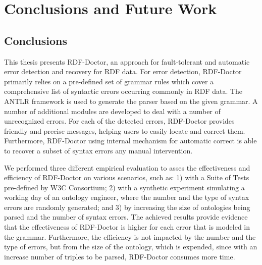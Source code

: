 \chapter{Conclusions and Future Work}
\label{ch:conclusions}

\section{Conclusions}

This thesis presents RDF-Doctor, an approach for fault-tolerant and automatic error detection and recovery for RDF data.
For error detection, RDF-Doctor primarily relies on a pre-defined set of grammar rules which cover a comprehensive list of syntactic errors occurring commonly in RDF data.
The ANTLR framework is used to generate the parser based on the given grammar.
A number of additional modules are developed to deal with a number of unrecognized errors.
For each of the detected errors, RDF-Doctor provides friendly and precise messages, helping users to easily locate and correct them.
Furthermore, RDF-Doctor using internal mechanism for automatic correct is able to recover a subset of syntax errors any manual intervention.

We performed three different empirical evaluation to asses the effectiveness and efficiency of RDF-Doctor on various scenarios, such as: 1) with a Suite of Tests pre-defined by W3C Consortium; 2) with a synthetic experiment simulating a working day of an ontology engineer, where the number and the type of syntax errors are randomly generated; and 3) by increasing the size of ontologies being parsed and the number of syntax errors.
The achieved results provide evidence that the effectiveness of RDF-Doctor is higher for each error that is modeled in the grammar. 
Furthermore, the efficiency is not impacted by the number and the type of errors, but from the size of the ontology, which is expended, since with an increase number of triples to be parsed, RDF-Doctor consumes more time. 




